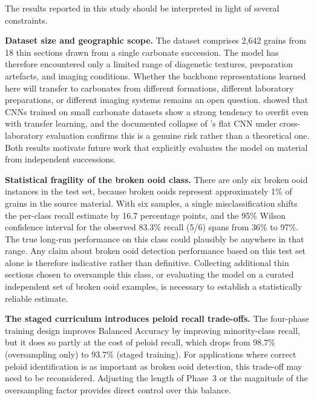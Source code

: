 \documentclass[a4paper,fleqn]{cas-dc}
\begin{document}
The results reported in this study should be interpreted in light of several constraints.

\textbf{Dataset size and geographic scope.} The dataset comprises 2,642 grains from 18 thin sections drawn from a single carbonate succession. The model has therefore encountered only a limited range of diagenetic textures, preparation artefacts, and imaging conditions. Whether the backbone representations learned here will transfer to carbonates from different formations, different laboratory preparations, or different imaging systems remains an open question. \citet{dawson2023dataset} showed that CNNs trained on small carbonate datasets show a strong tendency to overfit even with transfer learning, and the documented collapse of \citet{pireslima2020}'s flat CNN under cross-laboratory evaluation confirms this is a genuine risk rather than a theoretical one. Both results motivate future work that explicitly evaluates the model on material from independent successions.

\textbf{Statistical fragility of the broken ooid class.} There are only six broken ooid instances in the test set, because broken ooids represent approximately 1\% of grains in the source material. With six samples, a single misclassification shifts the per-class recall estimate by 16.7 percentage points, and the 95\% Wilson confidence interval for the observed 83.3\% recall (5/6) spans from 36\% to 97\%. The true long-run performance on this class could plausibly be anywhere in that range. Any claim about broken ooid detection performance based on this test set alone is therefore indicative rather than definitive. Collecting additional thin sections chosen to oversample this class, or evaluating the model on a curated independent set of broken ooid examples, is necessary to establish a statistically reliable estimate.

\textbf{The staged curriculum introduces peloid recall trade-offs.} The four-phase training design improves Balanced Accuracy by improving minority-class recall, but it does so partly at the cost of peloid recall, which drops from 98.7\% (oversampling only) to 93.7\% (staged training). For applications where correct peloid identification is as important as broken ooid detection, this trade-off may need to be reconsidered. Adjusting the length of Phase~3 or the magnitude of the oversampling factor provides direct control over this balance.
\end{document}
